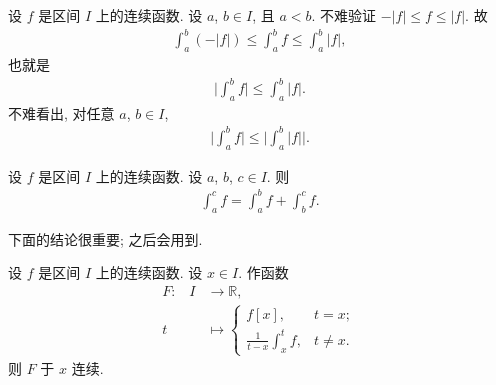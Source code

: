 \begin{example}
    设 $f$ 是区间 $I$ 上的连续函数. 设 $a$, $b \in I$, 且 $a < b$. 不难验证 $-|f| \leq f \leq |f|$. 故
    \begin{align*}
        \int_{a}^{b} {(-|f|)} \leq \int_{a}^{b} {f} \leq \int_{a}^{b} {|f|},
    \end{align*}
    也就是
    \begin{align*}
        \Bigg| \int_{a}^{b} {f} \Bigg| \leq \int_{a}^{b} {|f|}.
    \end{align*}
    不难看出, 对任意 $a$, $b \in I$,
    \begin{align*}
        \Bigg| \int_{a}^{b} {f} \Bigg| \leq \Bigg| \int_{a}^{b} {|f|} \Bigg|.
    \end{align*}
\end{example}

\begin{theorem}
    设 $f$ 是区间 $I$ 上的连续函数. 设 $a$, $b$, $c \in I$. 则
    \begin{align*}
        \int_{a}^{c} {f} = \int_{a}^{b} {f} + \int_{b}^{c} {f}.
    \end{align*}
\end{theorem}

下面的结论很重要; 之后会用到.

\begin{theorem} \label{theorem:newton-leibniz-prerequisite}
    设 $f$ 是区间 $I$ 上的连续函数. 设 $x \in I$. 作函数
    \begin{align*}
        \text{$F$:} \quad
        I & \to \mathbb{R},                                                       \\
        t & \mapsto \begin{cases}
                        f[x],                                             & t = x;    \\
                        {\displaystyle \frac{1}{t - x} \int_{x}^{t} {f}}, & t \neq x.
                    \end{cases}
    \end{align*}
    则 $F$ 于 $x$ 连续.
\end{theorem}

